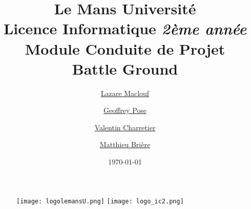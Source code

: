 \documentclass[a4paper,11pt]{article}
\begin{document}
\begin {figure}
\texttt{[image: logolemansU.png]}
\hspace{150pt} 
\texttt{[image: logo\_ic2.png]}
\end {figure}
\title {\textbf {\color {blue} Le Mans Université}\color{black}
\\  Licence Informatique  \textit {2ème année}
 \\Module Conduite de Projet
 \\ \textbf {Battle Ground }}
\author{{\href{mailto: Lazare.Maclouf.etu@univ-lemans.fr} {Lazare Maclouf}} \and 
        {\href{mailto: Geoffrey.Pose.etu@univ-lemans.fr} {Geoffrey Pose}} \and 
        {\href{mailto: Valentin.Charretier.etu@univ-lemans.fr} {Valentin Charretier}} \and 
        {\href{mailto: Matthieu.Brière.etu@univ-lemans.fr} {Matthieu Brière}}}
\date{\today} 
\maketitle 
\newpage
\tableofcontents
\newpage
\end{document}
